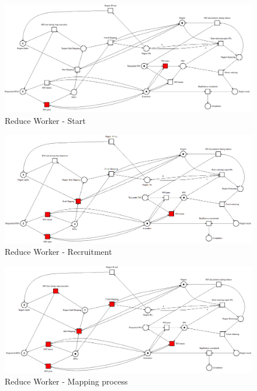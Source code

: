 \begin{figure}[!ht]
    \centering
    \includegraphics[width=\linewidth]{document/chapters/chapter_6/images/master_petri_net_1.png}
    \caption{Reduce Worker - Start}
    \label{fig:master_petri_net_1}
\end{figure}

\begin{figure}[!ht]
    \centering
    \includegraphics[width=\linewidth]{document/chapters/chapter_6/images/master_petri_net_2.png}
    \caption{Reduce Worker - Recruitment}
    \label{fig:master_petri_net_2}
\end{figure}

\begin{figure}[!ht]
    \centering
    \includegraphics[width=\linewidth]{document/chapters/chapter_6/images/master_petri_net_3.png}
    \caption{Reduce Worker - Mapping process}
    \label{fig:master_petri_net_3}
\end{figure}

